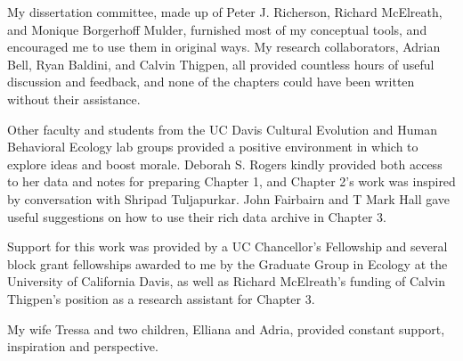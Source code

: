 
My dissertation committee, made up of Peter J. Richerson, Richard McElreath, and Monique Borgerhoff Mulder, furnished most of my conceptual tools, and encouraged me to use them in original ways.  My research collaborators, Adrian Bell, Ryan Baldini, and Calvin Thigpen, all provided countless hours of useful discussion and feedback, and none of the chapters could have been written without their assistance. 

Other faculty and students from the UC Davis Cultural Evolution and Human Behavioral Ecology lab groups provided a positive environment in which to explore ideas and boost morale.  Deborah S. Rogers kindly provided both access to her data and notes for preparing Chapter 1, and Chapter 2's work was inspired by conversation with Shripad Tuljapurkar.  John Fairbairn and T Mark Hall gave useful suggestions on how to use their rich data archive in Chapter 3.

Support for this work was provided by a UC Chancellor's Fellowship and several block grant fellowships awarded to me by the Graduate Group in Ecology at the University of California Davis, as well as Richard McElreath's funding of Calvin Thigpen's position as a research assistant for Chapter 3.

My wife Tressa and two children, Elliana and Adria, provided constant support, inspiration and perspective.

